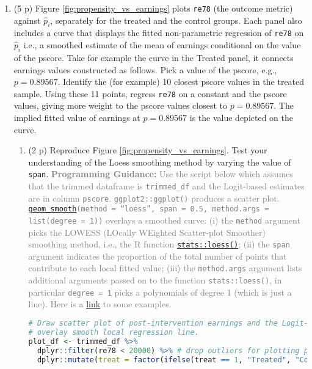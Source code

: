 \documentclass{article}
\begin{document}
\begin{enumerate}[label=\textbf{Q\arabic{enumi}}.,ref=Q\arabic{enumi}, wide=0pt, itemsep=0em, topsep=5pt, labelindent=0pt]
\item (5 p) Figure \ref{fig:propensity_vs_earnings} plots \texttt{re78} (the outcome metric) against $\widehat{p}_{i}$, separately for the treated and the control groups. Each panel also includes a curve that displays the fitted non-parametric regression of \texttt{re78} on $\widehat{p}_{i}$ i.e., a smoothed estimate of the mean of earnings conditional on the value of the pscore. Take for example the curve in the Treated panel, it connects earnings values constructed as follows. Pick a value of the pscore, e.g., $p=0.89567$. Identify the (for example) 10 closest pscore values in the treated sample. Using these 11 points, regress \texttt{re78} on a constant and the pscore values, giving more weight to the pscore values closest to $p=0.89567$. The implied fitted value of earnings at $p=0.89567$ is the value depicted on the curve.
\begin{enumerate}
\item (2 p) Reproduce Figure \ref{fig:propensity_vs_earnings}. Test your understanding of the Loess smoothing method by varying the value of \texttt{span}. \textcolor{gray}{\textbf{Programming Guidance:} Use the script below which assumes that the trimmed dataframe is \texttt{trimmed\_df} and the Logit-based estimates are in column \texttt{pscore}. \texttt{ggplot2::ggplot()} produces a scatter plot. \href{https://ggplot2.tidyverse.org/reference/geom_smooth.html}{\texttt{geom\_smooth}}\texttt{(method = ``loess'', span = 0.5, method.args = list(degree = 1))} overlays a smoothed curve: (i) the \texttt{method} argument picks the LOWESS (LOcally WEighted Scatter-plot Smoother) smoothing method, i.e., the R function \href{https://www.rdocumentation.org/packages/stats/versions/3.6.2/topics/loess}{\texttt{stats::loess()}}; (ii) the \texttt{span} argument indicates the proportion of the total number of points that contribute to each local fitted value; (iii) the \texttt{method.args} argument lists additional arguments passed on to the function \texttt{stats::loess()}, in particular \texttt{degree = 1} picks a polynomials of degree 1 (which is just a line). Here is a \href{https://ggplot2.tidyverse.org/reference/geom_smooth.html}{link} to some examples.} 
\begin{lstlisting}[language=R]
# Draw scatter plot of post-intervention earnings and the Logit-based pscore, by group;
# overlay smooth local regression line.
plot_df <- trimmed_df %>%
  dplyr::filter(re78 < 20000) %>% # drop outliers for plotting purposes
  dplyr::mutate(treat = factor(ifelse(treat == 1, "Treated", "Control")))

\end{lstlisting}
\end{enumerate}
\end{enumerate}
\end{document}
